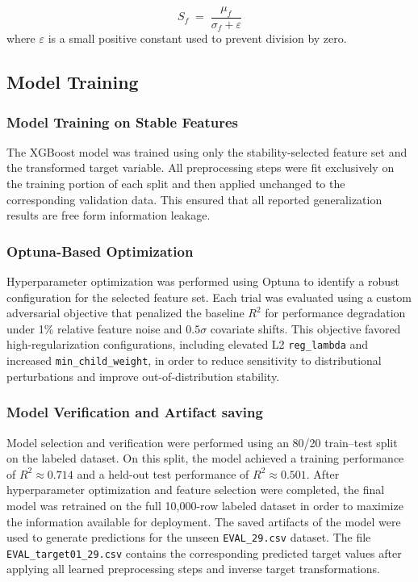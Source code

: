 \begin{equation}
S_f \;=\; \frac{\mu_f}{\sigma_f + \varepsilon}
\end{equation}
where $\varepsilon$ is a small positive constant used to prevent division by zero.

\subsection{Model Training}

\subsubsection{Model Training on Stable Features}
The XGBoost model was trained using only the stability-selected feature set and the transformed target variable. All preprocessing steps were fit exclusively on the training portion of each split and then applied unchanged to the corresponding validation data. This ensured that all reported generalization results are free form information leakage.

\subsubsection{Optuna-Based Optimization}
Hyperparameter optimization was performed using Optuna to identify a robust configuration for the selected feature set. Each trial was evaluated using a custom adversarial objective that penalized the baseline $R^2$ for performance degradation under 1\% relative feature noise and $0.5\sigma$ covariate shifts. This objective favored high-regularization configurations, including elevated L2 \texttt{reg\_lambda} and increased \texttt{min\_child\_weight}, in order to reduce sensitivity to distributional perturbations and improve out-of-distribution stability.

\subsubsection{Model Verification and Artifact saving}
Model selection and verification were performed using an 80/20 train--test split on the labeled dataset. On this split, the model achieved a training performance of $R^2 \approx 0.714$ and a held-out test performance of $R^2 \approx 0.501$. After hyperparameter optimization and feature selection were completed, the final model was retrained on the full 10{,}000-row labeled dataset in order to maximize the information available for deployment. The saved artifacts of the model were used to generate predictions for the unseen \texttt{EVAL\_29.csv} dataset. The file \texttt{EVAL\_target01\_29.csv} contains the corresponding predicted target values after applying all learned preprocessing steps and inverse target transformations.


